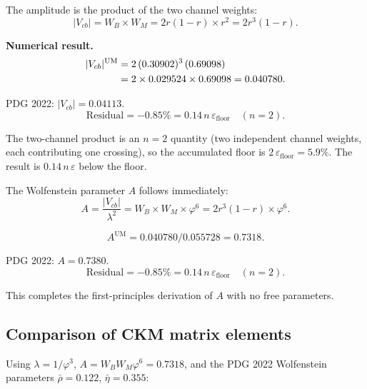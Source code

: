 \documentclass[12pt]{article}
\begin{document}
The amplitude is the product of the two channel weights:
\begin{equation}
  |V_{cb}| = W_B \times W_M = 2r(1-r) \times r^2 = 2r^3(1-r).
  \label{eq:Vcb}
\end{equation}

\textbf{Numerical result.}
\begin{align}
  |V_{cb}|^{\text{UM}} &= 2\,(0.30902)^3\,(0.69098) \notag\\
  &= 2 \times 0.029524 \times 0.69098 = 0.040780.
\end{align}

PDG 2022: $|V_{cb}| = 0.04113$.
\[
  \text{Residual} = -0.85\%
  = 0.14\,n\,\varepsilon_{\text{floor}} \quad (n = 2).
\]

The two-channel product is an $n = 2$ quantity (two independent channel
weights, each contributing one crossing), so the accumulated floor is
$2\,\varepsilon_{\text{floor}} = 5.9\%$. The result is $0.14\,n\,\varepsilon$
below the floor.

The Wolfenstein parameter $A$ follows immediately:
\begin{equation}
  A = \frac{|V_{cb}|}{\lambda^2}
    = W_B \times W_M \times \varphi^6
    = 2r^3(1-r) \times \varphi^6.
  \label{eq:A}
\end{equation}

\begin{equation}
  A^{\text{UM}} = 0.040780 / 0.055728 = 0.7318.
\end{equation}

PDG 2022: $A = 0.7380$.
\[
  \text{Residual} = -0.85\%
  = 0.14\,n\,\varepsilon_{\text{floor}} \quad (n = 2).
\]

This completes the first-principles derivation of $A$ with no free
parameters.

\subsection{Comparison of CKM matrix elements}

Using $\lambda = 1/\varphi^3$, $A = W_B W_M \varphi^6 = 0.7318$, and the
PDG 2022 Wolfenstein parameters $\bar\rho = 0.122$, $\bar\eta = 0.355$:
\end{document}
